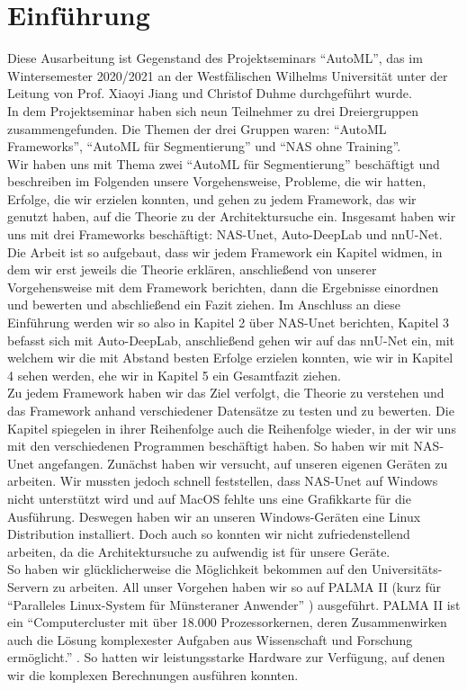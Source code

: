 \chapter{Einführung}
\label{ch:intro}

Diese Ausarbeitung ist Gegenstand des Projektseminars \enquote{AutoML}, das im Wintersemester 2020/2021 an der Westfälischen Wilhelms Universität unter der Leitung von Prof. Xiaoyi Jiang und Christof Duhme durchgeführt wurde.\\
In dem Projektseminar haben sich neun Teilnehmer zu drei Dreiergruppen zusammengefunden. Die Themen der drei Gruppen waren: \enquote{AutoML Frameworks}, \enquote{AutoML für Segmentierung} und \enquote{NAS ohne Training}.\\
Wir haben uns mit Thema zwei \enquote{AutoML für Segmentierung} beschäftigt und beschreiben im Folgenden unsere Vorgehensweise, Probleme, die wir hatten, Erfolge, die wir erzielen konnten, und gehen zu jedem Framework, das wir genutzt haben, auf die Theorie zu der Architektursuche ein. Insgesamt haben wir uns mit drei Frameworks beschäftigt: NAS-Unet, Auto-DeepLab und nnU-Net. Die Arbeit ist so aufgebaut, dass wir jedem Framework ein Kapitel widmen, in dem wir erst jeweils die Theorie erklären, anschließend von unserer Vorgehensweise mit dem Framework berichten, dann die Ergebnisse einordnen und bewerten und abschließend ein Fazit ziehen. Im Anschluss an diese Einführung werden wir so also in Kapitel 2 über NAS-Unet berichten, Kapitel 3 befasst sich mit Auto-DeepLab, anschließend gehen wir auf das nnU-Net ein, mit welchem wir die mit Abstand besten Erfolge erzielen konnten, wie wir in Kapitel 4 sehen werden, ehe wir in Kapitel 5 ein Gesamtfazit ziehen.\\
Zu jedem Framework haben wir das Ziel verfolgt, die Theorie zu verstehen und das Framework anhand verschiedener Datensätze zu testen und zu bewerten. Die Kapitel spiegelen in ihrer Reihenfolge auch die Reihenfolge wieder, in der wir uns mit den verschiedenen Programmen beschäftigt haben. So haben wir mit NAS-Unet angefangen. Zunächst haben wir versucht, auf unseren eigenen Geräten zu arbeiten. Wir mussten jedoch schnell feststellen, dass NAS-Unet auf Windows nicht unterstützt wird und auf MacOS fehlte uns eine Grafikkarte für die Ausführung. Deswegen haben wir an unseren Windows-Geräten eine Linux Distribution installiert. Doch auch so konnten wir nicht zufriedenstellend arbeiten, da die Architektursuche zu aufwendig ist für unsere Geräte.\\ So haben wir glücklicherweise die Möglichkeit bekommen auf den Universitäts-Servern zu arbeiten. All unser Vorgehen haben wir so auf PALMA II (kurz für \enquote{Paralleles Linux-System für Münsteraner Anwender} \cite{palmaII}) ausgeführt. PALMA II ist ein \enquote{Computercluster mit über 18.000 Prozessorkernen, deren Zusammenwirken auch die Lösung komplexester Aufgaben aus Wissenschaft und Forschung ermöglicht.} \cite{palmaII}. So hatten wir leistungsstarke Hardware zur Verfügung, auf denen wir die komplexen Berechnungen ausführen konnten.\\
